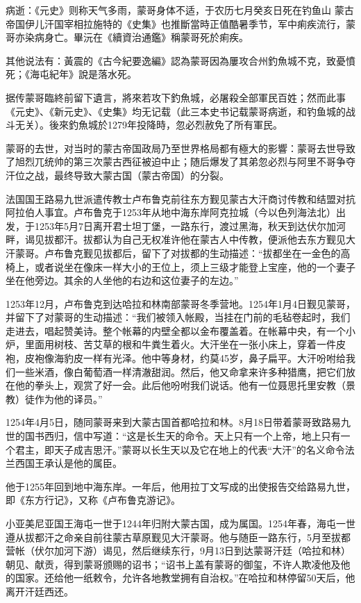 病逝：《元史》则称天气多雨，蒙哥身体不适，于农历七月癸亥日死在钓鱼山 蒙古帝国伊儿汗国宰相拉施特的《史集》也推斷當時正值酷暑季节，军中痢疾流行，蒙哥亦染病身亡。畢沅在《續資治通鑑》稱蒙哥死於痢疾。

其他说法有：黃震的《古今紀要逸編》認為蒙哥因為屢攻合州釣魚城不克，致憂憤死；《海屯紀年》說是落水死。

据传蒙哥臨終前留下遺言，將來若攻下釣魚城，必屠殺全部軍民百姓；然而此事《元史》、《新元史》、《史集》均无记载（此三本史书记载蒙哥病逝，和钓鱼城的战斗无关）。後來釣魚城於1279年投降時，忽必烈赦免了所有軍民。

蒙哥的去世，对当时的蒙古帝国政局乃至世界格局都有極大的影響：蒙哥去世导致了旭烈兀统帅的第三次蒙古西征被迫中止；随后爆发了其弟忽必烈与阿里不哥争夺汗位之战，最终导致大蒙古国（蒙古帝国）的分裂。

法国国王路易九世派遣传教士卢布鲁克前往东方觐见蒙古大汗商讨传教和结盟对抗阿拉伯人事宜。卢布鲁克于1253年从地中海东岸阿克拉城（今以色列海法北）出发，于1253年5月7日离开君士坦丁堡，一路东行，渡过黑海，秋天到达伏尔加河畔，谒见拔都汗。拔都认为自己无权准许他在蒙古人中传教，便派他去东方觐见大汗蒙哥。卢布鲁克觐见拔都后，留下了对拔都的生动描述：“拔都坐在一金色的高椅上，或者说坐在像床一样大小的王位上，须上三级才能登上宝座，他的一个妻子坐在他旁边。其余的人坐他的右边和这位妻子的左边。”

1253年12月，卢布鲁克到达哈拉和林南部蒙哥冬季营地。1254年1月4日觐见蒙哥，并留下了对蒙哥的生动描述：“我们被领入帐殿，当挂在门前的毛毡卷起时，我们走进去，唱起赞美诗。整个帐幕的内壁全都以金布覆盖着。在帐幕中央，有一个小炉，里面用树枝、苦艾草的根和牛粪生着火。大汗坐在一张小床上，穿着一件皮袍，皮袍像海豹皮一样有光泽。他中等身材，约莫45岁，鼻子扁平。大汗吩咐给我们一些米酒，像白葡萄酒一样清澈甜润。然后，他又命拿来许多种猎鹰，把它们放在他的拳头上，观赏了好一会。此后他吩咐我们说话。他有一位聂思托里安教（景教）徒作为他的译员。”

1254年4月5日，随同蒙哥来到大蒙古国首都哈拉和林。8月18日带着蒙哥致路易九世的国书西归，信中写道：“这是长生天的命令。天上只有一个上帝，地上只有一个君主，即天子成吉思汗。”蒙哥以长生天以及它在地上的代表“大汗”的名义命令法兰西国王承认是他的属臣。

他于1255年回到地中海东岸。一年后，他用拉丁文写成的出使报告交给路易九世，即《东方行记》，又称《卢布鲁克游记》。

小亚美尼亚国王海屯一世于1244年归附大蒙古国，成为属国。1254年春，海屯一世遵从拔都汗之命亲自前往蒙古草原觐见大汗蒙哥。他与随臣一路东行，5月至拔都营帐（伏尔加河下游）谒见，然后继续东行，9月13日到达蒙哥汗廷（哈拉和林）朝见、献贡，得到蒙哥颁赐的诏书；“诏书上盖有蒙哥的御玺，不许人欺凌他及他的国家。还给他一纸敕令，允许各地教堂拥有自治权。”在哈拉和林停留50天后，他离开汗廷西还。

